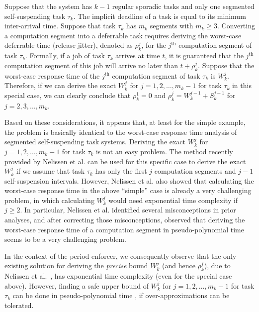 Suppose that the system has $k-1$ regular sporadic tasks and only one segmented self-suspending task $\tau_k$. The implicit deadline of a task is equal to its minimum inter-arrival time. Suppose that task $\tau_k$ has $m_k$ segments with $m_k \geq 3$.  Converting a computation segment into a deferrable task requires deriving the worst-case deferrable time (release jitter), denoted as $\rho_k^j$, for the $j^{\mathrm{th}}$ computation segment of task $\tau_k$. Formally, if a job of task $\tau_k$ arrives at time $t$, it is guaranteed that the $j^{\mathrm{th}}$ computation segment of this job will arrive no later than $t+\rho_k^j$. Suppose that the worst-case response time of the $j^{\mathrm{th}}$ computation segment of task $\tau_k$ is $W_k^j$. Therefore,  if we can derive the exact $W_k^j$ for $j=1,2,\ldots,m_k-1$ for task $\tau_k$ in this special case, we can clearly conclude that $\rho_k^1=0$ and $\rho_k^j = W_k^{j-1}+S_k^{j-1}$ for $j=2,3,\ldots,m_k$.


Based on these considerations, it appears that, at least for the simple example, the problem is basically identical to the worst-case response time analysis of segmented self-suspending task systems. Deriving the exact $W_k^j$ for $j=1,2,\ldots,m_k-1$ for task $\tau_k$ is not an easy problem.  The method recently provided by Nelissen et al. \cite{ecrts15nelissen} can be used for this specific case to derive the exact $W_k^j$ if we assume that task $\tau_k$ has only the first $j$ computation segments and $j-1$ self-suspension intervals.  However, Nelissen et al. \cite{ecrts15nelissen} also showed that calculating the worst-case response time in the above ``simple'' case is already a very challenging problem, in which calculating $W_k^j$ would need exponential time complexity if $j \geq 2$.
In particular, Nelissen et al. \cite{ecrts15nelissen} identified several misconceptions in prior analyses, and after correcting those misconceptions, observed that deriving the worst-case response time of a computation segment in pseudo-polynomial time seems to be a very challenging problem. 

In the context of the period enforcer, we consequently observe that the only existing solution for deriving the \emph{precise} bound $W_k^{j}$ (and hence $\rho_k^j$), due to Nelissen et al.\ \cite{ecrts15nelissen},  has exponential time complexity (even for the special case above).
However, finding a safe upper bound of $W_k^j$ for $j=1,2,\ldots,m_k-1$ for task $\tau_k$ can be done in pseudo-polynomial time \cite{PH:rtss98}, if over-approximations can be tolerated. 


